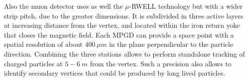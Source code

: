 Also the muon detector uses as well the $\mu$-RWELL technology but with a wider strip pitch, due to the greater dimensions.  It is subdivided in three active layers at increasing distance from the vertex, and located within the iron return yoke that closes the magnetic field. Each MPGD can provide a space point with a spatial resolution of about $400\ \mu m$ in the plane perpendicular to the particle direction. Combining the three stations allows to perform standalone tracking of charged particles at $5-6\ m$ from the vertex. Such a precision also allows to identify secondary vertices that could be produced by long lived particles.